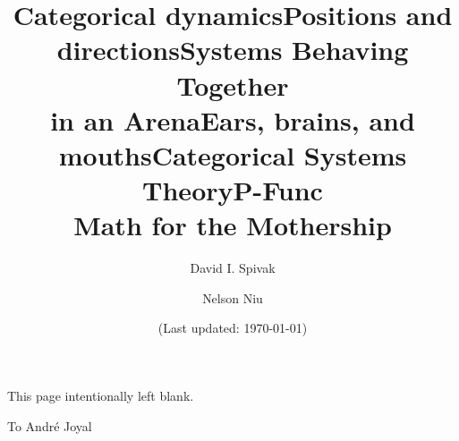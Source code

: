 \documentclass[11pt, book]{memoir}
\newcommand{\titlefont}{\normalfont\Huge\bfseries}
\theoremstyle{plain}
\theoremstyle{plain}
\theoremstyle{remark}
\newenvironment{dedication}
     {\hfill}
     {}
\newcommand{\0}{\textsf{0}}
\newcommand{\1}{\textsf{1}}
\newcommand{\2}{\textsf{2}}
\newcommand{\3}{\textsf{3}}
\newcommand{\4}{\textsf{4}}
\newcommand{\5}{\textsf{5}}
\newcommand{\6}{\textsf{6}}
\newcommand{\7}{\textsf{7}}
\newcommand{\8}{\textsf{8}}
\newcommand{\9}{\textsf{9}}
\begin{document}
\frontmatter

\title{\titlefont Categorical dynamics}
\title{\titlefont Positions and directions}
\title{\titlefont Systems Behaving Together\\in an Arena}
\title{\titlefont Ears, brains, and mouths}
\title{\titlefont Categorical Systems Theory}
\title{\titlefont P-Func\\\medskip\huge Math for the Mothership}


\author{
\LARGE  David I. Spivak 
\and
\LARGE Nelson Niu 
\normalsize}




\posttitle{
\vspace{.8in}
\normalsize
\[
\coverpic
\]
  \vspace{.5in}
  \endgroup
}
\date{\vfill (Last updated: \today)}



\maketitle


\thispagestyle{empty}
\clearpage
This page intentionally left blank.
\clearpage

\begin{dedication}
To Andr\'e Joyal
\end{dedication}

\clearpage



\clearpage
\tableofcontents*

\mainmatter




\appendix
\begingroup
\footnotesize



\backmatter

\printbibliography
\printindex
\end{document}
